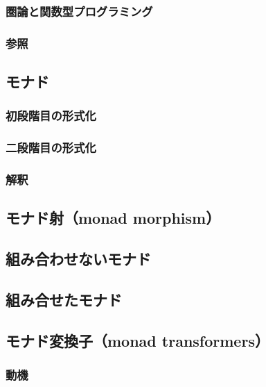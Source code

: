 \documentclass[11pt, oneside]{jsarticle}   	%
\begin{document}
\subsubsection{ 圏論と関数型プログラミング }
\subsubsection{ 参照 }
\subsection{ モナド }
\subsubsection{ 初段階目の形式化 }
\subsubsection{ 二段階目の形式化 }
\subsubsection{ 解釈 }




\subsection{ モナド射（monad morphism） }
\subsection{ 組み合わせないモナド }



\subsection{ 組み合せたモナド }
\subsection{ モナド変換子（monad transformers） }
\subsubsection{  動機 }
\end{document}

